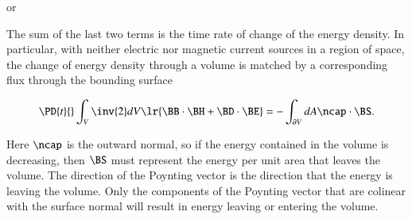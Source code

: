 or

The sum of the last two terms is the time rate of change of the energy density.
In particular,
with neither electric nor magnetic current sources in a region of space,
the change of energy density through a volume is matched by a corresponding flux through the bounding surface

\begin{dmath}\label{eqn:maxwellsEquations:740}
\PD{t}{} \int_V
\inv{2} dV \lr{
\BB \cdot \BH
+ \BD \cdot \BE
}
=
-\int_{\partial V} dA \ncap \cdot \BS.
\end{dmath}

Here \( \ncap \) is the outward normal, so if the energy contained in the volume is decreasing, then \( \BS \) must represent the energy per unit area that leaves the volume.
The direction of the Poynting vector is the direction that the energy is leaving the volume.
Only the components of the Poynting vector that are colinear with the surface normal will result in energy leaving or entering the volume.

